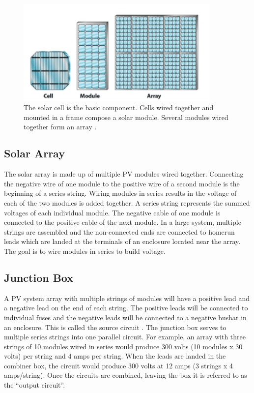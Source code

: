 \begin{figure}[H]
	\centering
	\includegraphics[width=10cm, keepaspectratio]{chapters/1_introduction/imgs/solarmodule.png}
	\caption{The solar cell is the basic component. Cells wired together
		and mounted in a frame compose a solar module. Several modules
		wired together form an array \cite{pvarizona}.}
	\label{fig:solmodule}
\end{figure}

\subsection{Solar Array}
The solar array is made up of multiple PV modules wired
together. Connecting the negative wire of one module to
the positive wire of a second module is the beginning of a
series string. Wiring modules in series results in the voltage of
each of the two modules is added together. A series string represents the summed voltages of each
individual module. The negative cable of one module is connected
to the positive cable of the next module. In a large system,
multiple strings are assembled and the non-connected ends are
connected to homerun leads which are landed at the terminals
of an enclosure located near the array.
The goal is to wire modules in series to build voltage.

\subsection{Junction Box}
A PV system array with multiple strings of modules will
have a positive lead and a negative lead on the end of each
string. The positive leads will be connected to individual
fuses and the negative leads will be connected to a negative
busbar in an enclosure. This is called the source circuit \cite{pvarizona}. The
junction box serves to  multiple series strings into
one parallel circuit. For example, an array with three strings
of 10 modules wired in series would produce 300 volts (10
modules x 30 volts) per string and 4 amps per string. When
the leads are landed in the combiner box, the circuit would
produce 300 volts at 12 amps (3 strings x 4 amps/string). Once
the circuits are combined, leaving the box it is referred to as
the “output circuit”.

